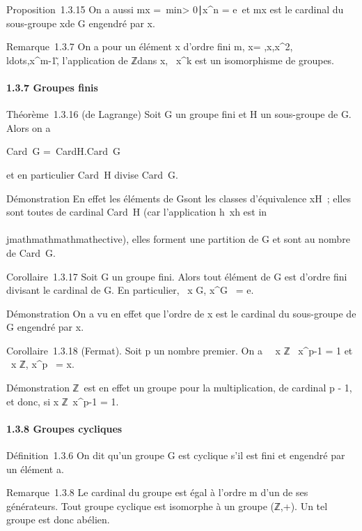 Proposition~1.3.15 On a aussi mx =\
min\n \textgreater{}
0∣x^n = e\ et
mx est le cardinal du sous-groupe \langle
x\rangle de G engendré par x.

Remarque~1.3.7 On a pour un élément x d'ordre fini m,
\langle x\rangle =
\e,x,x^2,\\ldots,x^m-1\~,
l'application de ℤ dans \langle
x\rangle ,
\overlinek\mapsto~x^k
est un isomorphisme de groupes.

\paragraph{1.3.7 Groupes finis}

Théorème~1.3.16 (de Lagrange) Soit G un groupe fini et H un sous-groupe
de G. Alors on a

Card~G =\
CardH.Card~G\diagupH

et en particulier Card~H divise
Card~G.

Démonstration En effet les éléments de G\diagupH sont les classes
d'équivalence xH~; elles sont toutes de cardinal
Card~H (car l'application
h\mapsto~xh est in\\\\jmathmathmathmathective), elles forment une
partition de G et sont au nombre de Card~G\diagupH.

Corollaire~1.3.17 Soit G un groupe fini. Alors tout élément de G est
d'ordre fini divisant le cardinal de G. En particulier,
\forall~x \in G, x^\textbar{}G\textbar{}~ =
e.

Démonstration On a vu en effet que l'ordre de x est le cardinal du
sous-groupe de G engendré par x.

Corollaire~1.3.18 (Fermat). Soit p un nombre premier. On a
\forall~~x \in ℤ
\diagdown\0\, x^p-1 = 1 et
\forall~x \in ℤ, x^p~ = x.

Démonstration ℤ \diagdown\0\ est en effet
un groupe pour la multiplication, de cardinal p - 1, et donc, si x \in
ℤ\diaguppℤ \diagdown\0\, x^p-1 = 1.

\paragraph{1.3.8 Groupes cycliques}

Définition~1.3.6 On dit qu'un groupe G est cyclique s'il est fini et
engendré par un élément a.

Remarque~1.3.8 Le cardinal du groupe est égal à l'ordre m d'un de ses
générateurs. Tout groupe cyclique est isomorphe à un groupe (ℤ,+). Un
tel groupe est donc abélien.

